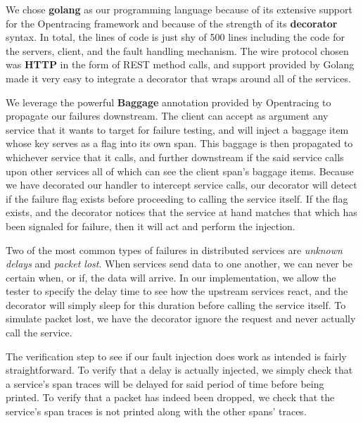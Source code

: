\documentclass[letterpaper,twocolumn,10pt]{article}
\begin{document}
We chose \textbf{golang}\cite{google:golang} as our programming language because of its extensive support for the Opentracing framework and because of the strength of its \textbf{decorator} syntax. In total, the lines of code is just shy of 500 lines including the code for the servers, client, and the fault handling mechanism. The wire protocol chosen was \textbf{HTTP} in the form of REST method calls, and support provided by Golang made it very easy to integrate a decorator that wraps around all of the services. 

We leverage the powerful \textbf{Baggage} annotation provided by Opentracing to propagate our failures downstream. The client can accept as argument any service that it wants to target for failure testing, and will inject a baggage item whose key serves as a flag into its own span. This baggage is then propagated to whichever service that it calls, and further downstream if the said service calls upon other services all of which can see the client span's baggage items. Because we have decorated our handler to intercept service calls, our decorator will detect if the failure flag exists before proceeding to calling the service itself. If the flag exists, and the decorator notices that the service at hand matches that which has been signaled for failure, then it will act and perform the injection. 

Two of the most common types of failures in distributed services are \textit{unknown delays} and \textit{packet lost}. When services send data to one another, we can never be certain when, or if, the data will arrive. In our implementation, we allow the tester to specify the delay time to see how the upstream services react, and the decorator will simply sleep for this duration before calling the service itself. To simulate packet lost, we have the decorator ignore the request and never actually call the service. 

The verification step to see if our fault injection does work as intended is fairly straightforward. To verify that a delay is actually injected, we simply check that a service's span traces will be delayed for said period of time before being printed. To verify that a packet has indeed been dropped, we check that the service's span traces is not printed along with the other spans' traces.
\end{document}
